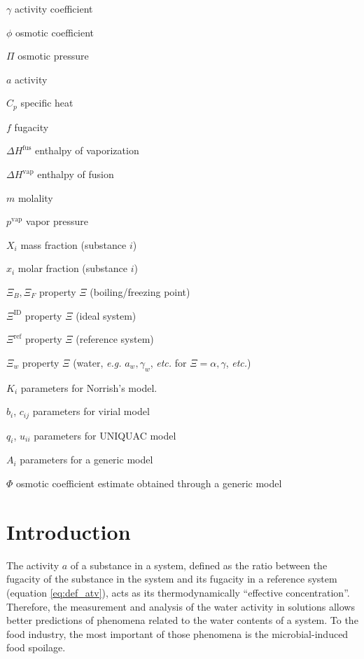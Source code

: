 \documentclass[
	12pt,				%
	openright,
	twoside,
	a4paper,			%
	brazil,			%
	french,				%
	spanish,			%
	english				%
	]{abntex2}
\begin{document}
\begin{simbolos}
	\item[$ \gamma $] activity coefficient
	\item[$ \phi $] osmotic coefficient
	\item[$ \Pi $] osmotic pressure
	\item[$ a $] activity
	\item[$ C_p $] specific heat
	\item[$ f $] fugacity
	\item[$ \Delta H^\text{fus} $] enthalpy of vaporization
	\item[$ \Delta H^\text{vap} $] enthalpy of fusion
	\item[$ m $] molality
	\item[$ p^\text{vap} $] vapor pressure
	\item[$ X_i $] mass fraction (substance $i$)
	\item[$ x_i $] molar fraction (substance $i$)
	\item[$ \Xi_B, \Xi_F $] property $\Xi$ (boiling/freezing point)
	\item[$ \Xi^\text{ID} $] property $\Xi$ (ideal system)
	\item[$ \Xi^\text{ref} $] property $\Xi$ (reference system)
	\item[$ \Xi_w $] property $\Xi$ (water, \textit{e.g.} $a_w, %
		\gamma_w$, \textit{etc.} %
		for $\Xi = \alpha, \gamma$, \textit{etc.})
	\item[$K_i$] parameters for Norrish's model.
	\item[$b_i$, $c_{ij}$] parameters for virial model
	\item[$q_i$, $u_{ii}$] parameters for UNIQUAC model
	\item[$A_i$] parameters for a generic model
	\item[$\Phi$] osmotic coefficient estimate obtained through a generic model
\end{simbolos}

\tableofcontents*
\cleardoublepage

\textual

\part{Introduction}

The activity $a$ of a substance in a system, defined \cite{sandler2017} as
the ratio between the fugacity of the substance in the system and its fugacity
in a reference system (equation \ref{eq:def_atv}), acts as its thermodynamically
``effective concentration''. Therefore, the measurement and analysis of the water
activity in solutions allows better predictions of phenomena related to the water
contents of a system. To the food industry, the most important of those phenomena
is the microbial-induced food spoilage.
\end{document}
